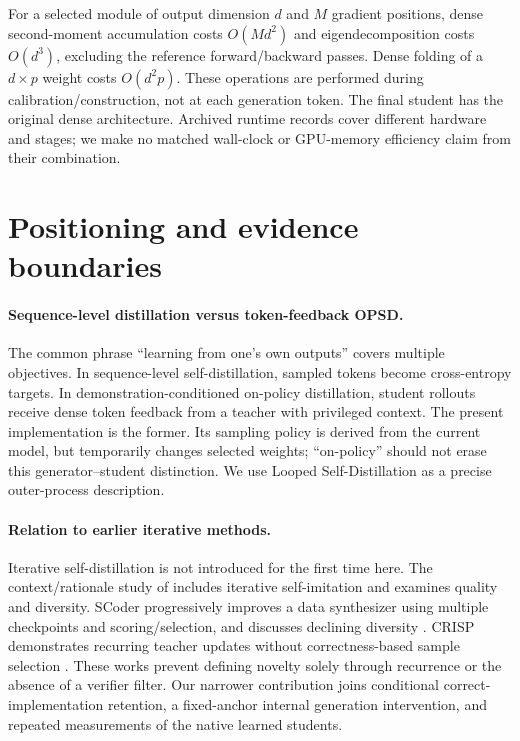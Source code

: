 \documentclass{article}
\begin{document}
For a selected module of output dimension $d$ and $M$ gradient positions, dense second-moment accumulation costs $O(Md^2)$ and eigendecomposition costs $O(d^3)$, excluding the reference forward/backward passes. Dense folding of a $d\times p$ weight costs $O(d^2p)$. These operations are performed during calibration/construction, not at each generation token. The final student has the original dense architecture. Archived runtime records cover different hardware and stages; we make no matched wall-clock or GPU-memory efficiency claim from their combination.

\FloatBarrier
\section{Positioning and evidence boundaries}
\label{app:positioning}
\paragraph{Sequence-level distillation versus token-feedback OPSD.}
The common phrase ``learning from one's own outputs'' covers multiple objectives. In sequence-level self-distillation, sampled tokens become cross-entropy targets. In demonstration-conditioned on-policy distillation, student rollouts receive dense token feedback from a teacher with privileged context. The present implementation is the former. Its sampling policy is derived from the current model, but temporarily changes selected weights; ``on-policy'' should not erase this generator--student distinction. We use Looped Self-Distillation as a precise outer-process description.

\paragraph{Relation to earlier iterative methods.}
Iterative self-distillation is not introduced for the first time here. The context/rationale study of \citet{rao2023iterative} includes iterative self-imitation and examines quality and diversity. SCoder progressively improves a data synthesizer using multiple checkpoints and scoring/selection, and discusses declining diversity \citep{zhang2025scoder}. CRISP demonstrates recurring teacher updates without correctness-based sample selection \citep{sang2026crisp}. These works prevent defining novelty solely through recurrence or the absence of a verifier filter. Our narrower contribution joins conditional correct-implementation retention, a fixed-anchor internal generation intervention, and repeated measurements of the native learned students.
\end{document}
